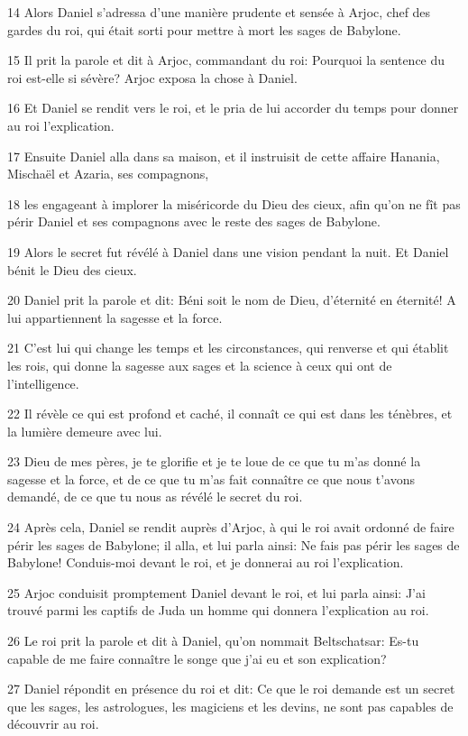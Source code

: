 \par 14 Alors Daniel s'adressa d'une manière prudente et sensée à Arjoc, chef des gardes du roi, qui était sorti pour mettre à mort les sages de Babylone.
\par 15 Il prit la parole et dit à Arjoc, commandant du roi: Pourquoi la sentence du roi est-elle si sévère? Arjoc exposa la chose à Daniel.
\par 16 Et Daniel se rendit vers le roi, et le pria de lui accorder du temps pour donner au roi l'explication.
\par 17 Ensuite Daniel alla dans sa maison, et il instruisit de cette affaire Hanania, Mischaël et Azaria, ses compagnons,
\par 18 les engageant à implorer la miséricorde du Dieu des cieux, afin qu'on ne fît pas périr Daniel et ses compagnons avec le reste des sages de Babylone.
\par 19 Alors le secret fut révélé à Daniel dans une vision pendant la nuit. Et Daniel bénit le Dieu des cieux.
\par 20 Daniel prit la parole et dit: Béni soit le nom de Dieu, d'éternité en éternité! A lui appartiennent la sagesse et la force.
\par 21 C'est lui qui change les temps et les circonstances, qui renverse et qui établit les rois, qui donne la sagesse aux sages et la science à ceux qui ont de l'intelligence.
\par 22 Il révèle ce qui est profond et caché, il connaît ce qui est dans les ténèbres, et la lumière demeure avec lui.
\par 23 Dieu de mes pères, je te glorifie et je te loue de ce que tu m'as donné la sagesse et la force, et de ce que tu m'as fait connaître ce que nous t'avons demandé, de ce que tu nous as révélé le secret du roi.
\par 24 Après cela, Daniel se rendit auprès d'Arjoc, à qui le roi avait ordonné de faire périr les sages de Babylone; il alla, et lui parla ainsi: Ne fais pas périr les sages de Babylone! Conduis-moi devant le roi, et je donnerai au roi l'explication.
\par 25 Arjoc conduisit promptement Daniel devant le roi, et lui parla ainsi: J'ai trouvé parmi les captifs de Juda un homme qui donnera l'explication au roi.
\par 26 Le roi prit la parole et dit à Daniel, qu'on nommait Beltschatsar: Es-tu capable de me faire connaître le songe que j'ai eu et son explication?
\par 27 Daniel répondit en présence du roi et dit: Ce que le roi demande est un secret que les sages, les astrologues, les magiciens et les devins, ne sont pas capables de découvrir au roi.
